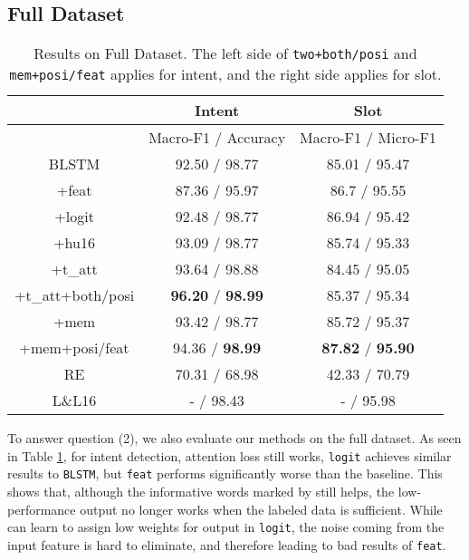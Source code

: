 

\subsection{Full Dataset}

\begin{table}
\setlength{\tabcolsep}{0.23em}
\centering
\small{
\begin{tabular}{|c|c|c|}

\hline
 & Intent & Slot \\ 
\hline
  & Macro-F1 / Accuracy &  Macro-F1 / Micro-F1 \\
\hline
BLSTM & 92.50 / 98.77  & 85.01 / 95.47\\
\hline
+feat & 87.36 / 95.97 & 86.7 / 95.55\\
\hline
+logit & 92.48 / 98.77 & 86.94 / 95.42  \\
\hline
+hu16 & 93.09 / 98.77 & 85.74 / 95.33  \\
\hline
+t\_att & 93.64 / 98.88  & 84.45 / 95.05\\
\hline
+t\_att+both/posi & \textbf{96.20} / \textbf{98.99} & 85.37 / 95.34 \\
\hline
+mem & 93.42 / 98.77 & 85.72 / 95.37\\
\hline
+mem+posi/feat & 94.36 / \textbf{98.99} & \textbf{87.82} / \textbf{95.90} \\
\hline
\hline
RE & 70.31 / 68.98 & 42.33 / 70.79\\
\hline
L\&L16 & - / 98.43 & - / 95.98\\
\hline 

\end{tabular}
}
\caption{Results on Full Dataset. The left side of \texttt{two+both/posi} and \texttt{mem+posi/feat} applies for intent, and the right side applies for slot.} 
\label{tab_full}
\end{table}

To answer question (2), we also evaluate our methods on the full dataset. As seen in Table \ref{tab_full}, for intent detection, attention loss still works, \texttt{logit} achieves similar results to \texttt{BLSTM}, but \texttt{feat} performs significantly worse than the baseline. This shows that, although the informative words marked by \RE still helps, the low-performance \RE output no longer works when the labeled data is sufficient. While \NN can learn to assign low weights for \RE output in \texttt{logit}, the noise coming from the input feature is hard to eliminate, and therefore leading to bad results of \texttt{feat}.

